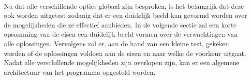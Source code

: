 \documentclass{article}
\begin{document}
\paragraph{}
Nu dat alle verschillende opties globaal zijn besproken, is het belangrijk dat deze ook worden uitgetest zodanig dat er een duidelijk beeld kan gevormd worden over de mogelijkheden die ze effectief aanbieden.
In de volgende sectie zal een korte opsomming van de eisen een duidelijk beeld vormen over de verwachtingen van alle oplossingen.
Vervolgens zal er, aan de hand van een kleine test, gekeken worden of de oplossingen voldoen aan de eisen en naar welke de voorkeur uitgaat.
Nadat alle verschillende mogelijkheden zijn overlopen zijn, kan er een algemene architectuur van het programma opgesteld worden.

%
\end{document}
